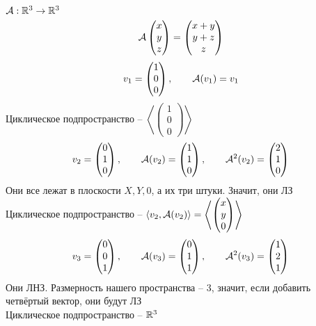 \begin{eg}
	$ \mathcal{A} : \mathbb{R}^3 \to \mathbb{R}^3 $
	$$ \mathcal{A}
	\begin{pmatrix}
		x \\
		y \\
		z
	\end{pmatrix} =
	\begin{pmatrix}
		x + y \\
		y + z \\
		z
	\end{pmatrix} $$
	$$ v_1 =
	\begin{pmatrix}
		1 \\
		0 \\
		0
	\end{pmatrix}, \qquad \mathcal{A}(v_1) = v_1 $$
	Циклическое подпространство -- $ \left\langle
	\begin{pmatrix}
		1 \\
		0 \\
		0
	\end{pmatrix} \right\rangle $
	$$ v_2 =
	\begin{pmatrix}
		0 \\
		1 \\
		0
	\end{pmatrix}, \qquad \mathcal{A}(v_2) =
	\begin{pmatrix}
		1 \\
		1 \\
		0
	\end{pmatrix}, \qquad \mathcal{A}^2(v_2) =
	\begin{pmatrix}
		2 \\
		1 \\
		0
	\end{pmatrix} $$
	Они все лежат в плоскости $ X, Y, 0 $, а их три штуки. Значит, они ЛЗ \\
	Циклическое подпространство -- $ \Braket{v_2, \mathcal{A}(v_2)} = \left\langle
	\begin{pmatrix}
		x \\
		y \\
		0
	\end{pmatrix} \right\rangle $
	$$ v_3 =
	\begin{pmatrix}
		0 \\
		0 \\
		1
	\end{pmatrix}, \qquad \mathcal{A}(v_3) =
	\begin{pmatrix}
		0 \\
		1 \\
		1
	\end{pmatrix}, \qquad \mathcal{A}^2(v_3) =
	\begin{pmatrix}
		1 \\
		2 \\
		1
	\end{pmatrix} $$
	Они ЛНЗ. Размерность нашего пространства -- 3, значит, если добавить четвёртый вектор, они будут ЛЗ \\
	Циклическое подпространство -- $ \mathbb{R}^3 $
\end{eg}

